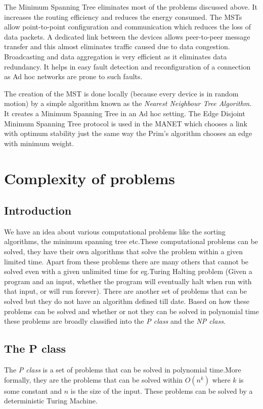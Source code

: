 \documentclass[12pt]{article}
\theoremstyle{plain}
\begin{document}
The Minimum Spanning Tree eliminates most of the problems discussed above. It increases the routing efficiency and reduces the energy consumed. The MSTs allow point-to-point configuration and communication which reduces the loss of data packets. A dedicated link between the devices allows peer-to-peer message transfer and this almost eliminates traffic caused due to data congestion. Broadcasting and data aggregation is very efficient as it eliminates data redundancy. It helps in easy fault detection and reconfiguration of a connection as Ad hoc networks are prone to such faults.

The creation of the MST is done locally (because every device is in random motion) by a simple algorithm known as the \textit{Nearest Neighbour Tree Algorithm}. It creates a Minimum Spanning Tree in an Ad hoc setting. The Edge Disjoint Minimum Spanning Tree protocol is used in the MANET which chooses a link with optimum stability just the same way the Prim's algorithm chooses an edge with minimum weight.

\section*{Complexity of problems}
\subsection*{Introduction}

We have an idea about various computational problems like the sorting algorithms, the minimum spanning tree etc.These computational problems can be solved, they have their own algorithms that solve the problem within a given limited time. Apart from these problems there are many others that cannot be solved even with a given unlimited time for eg.Turing Halting problem (Given a program and an input, whether the program will eventually halt when run with that input, or will run forever). There are another set of problems that can be solved but they do not have an algorithm defined till date. Based on how these problems can be solved and whether or not they can be solved in polynomial time these problems are broadly classified into the  \textit{P class} and the \textit{NP class}.


\subsection*{The P class}
The \textit{P class} is a set of problems that can be solved in polynomial time.More formally,  they are the problems that can be solved within $O(n^k)$ where $k $ is some constant and $n$ is the size of the input. These problems can be solved by a  deterministic Turing Machine.
\end{document}
